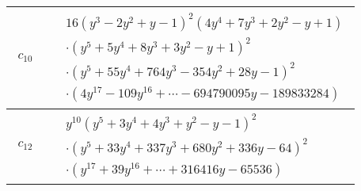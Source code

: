 \documentclass[1p]{elsarticle_modified}
\theoremstyle{definition}
\begin{document}
\begin{tabular}{m{50pt}|m{274pt}}
\hline $$\begin{aligned}c_{10}\end{aligned}$$&$\begin{aligned}
&16(y^3-2 y^2+y-1)^2(4 y^4+7 y^3+2 y^2- y+1)\\
&\cdot(y^5+5 y^4+8 y^3+3 y^2- y+1)^2\\
&\cdot(y^5+55 y^4+764 y^3-354 y^2+28 y-1)^2\\
&\cdot(4 y^{17}-109 y^{16}+\cdots-694790095 y-189833284)
\end{aligned}$\\
\hline $$\begin{aligned}c_{12}\end{aligned}$$&$\begin{aligned}
&y^{10}(y^5+3 y^4+4 y^3+y^2- y-1)^2\\
&\cdot(y^5+33 y^4+337 y^3+680 y^2+336 y-64)^2\\
&\cdot(y^{17}+39 y^{16}+\cdots+316416 y-65536)
\end{aligned}$\\
\hline
\end{tabular}
\vskip 2pc
\end{document}
